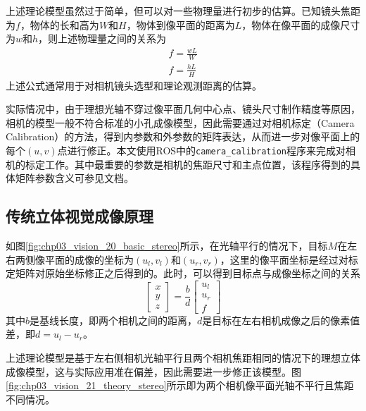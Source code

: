 上述理论模型虽然过于简单，但可以对一些物理量进行初步的估算。已知镜头焦距为$f$，物体的长和高为$W$和$H$，物体到像平面的距离为$L$，物体在像平面的成像尺寸为$w$和$h$，则上述物理量之间的关系为
\begin{align}
f=\frac{wL}{W} \\
f=\frac{hL}{H}
\end{align}
上述公式通常用于对相机镜头选型和理论观测距离的估算。

实际情况中，由于理想光轴不穿过像平面几何中心点、镜头尺寸制作精度等原因，相机的模型一般不符合标准的小孔成像模型，因此需要通过对相机标定（Camera Calibration）的方法，得到内参数和外参数的矩阵表达，从而进一步对像平面上的每个$(u,v)$点进行修正。本文使用ROS中的\texttt{camera\_calibration}\cite{ros_camera_calibration}程序来完成对相机的标定工作。其中最重要的参数是相机的焦距尺寸和主点位置，该程序得到的具体矩阵参数含义可参见文档\cite{ros_camera_message}。

\subsection{传统立体视觉成像原理}
如图\ref{fig:chp03_vision_20_basic_stereo}所示，在光轴平行的情况下，目标$M$在左右两侧像平面的成像的坐标为$(u_l, v_l)$和$(u_r, v_r)$，这里的像平面坐标是经过对标定矩阵对原始坐标修正之后得到的。此时，可以得到目标点与成像坐标之间的关系
\begin{equation}
\left[ {\begin{array}{*{20}{c}}
	x \\ 
	y \\ 
	z 
	\end{array}} \right] =\frac{b}{d} \left[ {\begin{array}{*{20}{c}}
	u_l \\ 
	u_r \\ 
	f 
	\end{array}} \right]
\end{equation}
其中$b$是基线长度，即两个相机之间的距离，$d$是目标在左右相机成像之后的像素值差，即$d=u_l-u_r$。

上述理论模型是基于左右侧相机光轴平行且两个相机焦距相同的情况下的理想立体成像模型，这与实际应用准在偏差，因此需要进一步修正该模型。图\ref{fig:chp03_vision_21_theory_stereo}所示即为两个相机像平面光轴不平行且焦距不同情况。



